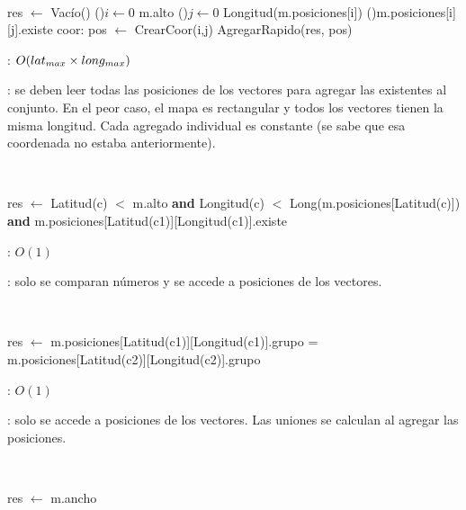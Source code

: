 \begin{Algoritmos}
	~

	\begin{algorithm}[H]
		\NoCaptionOfAlgo
		\caption{}
		res $\leftarrow$ Vacío()
		\For(\OdeBloque{\compmatriz}){$i \leftarrow 0$ \KwTo m.alto}{
			\For(){$j \leftarrow 0$ \KwTo Longitud(m.posiciones[i])}{
				\If(){m.posiciones[i][j].existe}{
					coor: pos $\leftarrow$ CrearCoor(i,j)
					AgregarRapido(res, pos)
				}
			}
		}
	\end{algorithm}

	\complejidad: $O(lat_{max} \times long_{max})$

	\justifcomp: se deben leer todas las posiciones de los vectores para agregar las existentes al conjunto. En el peor caso, el mapa es rectangular y todos los vectores tienen la misma longitud. Cada agregado individual es constante (se sabe que esa coordenada no estaba anteriormente).

	~

	\begin{algorithm}[H]
		\NoCaptionOfAlgo
		\caption{}
		res $\leftarrow$ Latitud(c) $<$ m.alto \textbf{and} Longitud(c) $<$ Long(m.posiciones[Latitud(c)]) \textbf{and} m.posiciones[Latitud(c1)][Longitud(c1)].existe
	\end{algorithm}

	\complejidad: $O(1)$

	\justifcomp: solo se comparan números y se accede a posiciones de los vectores.

	~

	\begin{algorithm}[H]
		\NoCaptionOfAlgo
		\caption{}
		res $\leftarrow$ m.posiciones[Latitud(c1)][Longitud(c1)].grupo = m.posiciones[Latitud(c2)][Longitud(c2)].grupo
	\end{algorithm}

	\complejidad: $O(1)$

	\justifcomp: solo se accede a posiciones de los vectores. Las uniones se calculan al agregar las posiciones.

	~

	\begin{algorithm}[H]
		\NoCaptionOfAlgo
		\caption{}
		res $\leftarrow$ m.ancho
	\end{algorithm}


\end{Algoritmos}
